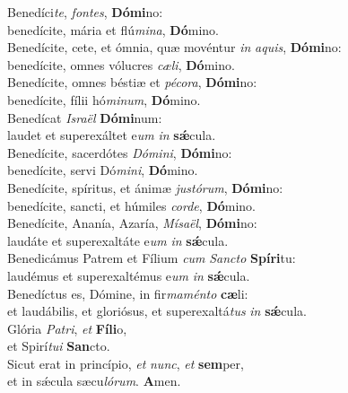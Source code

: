 \evenverse Benedíci\textit{te}, \textit{fon}\textit{tes}, \textbf{Dó}\textbf{mi}no:~\*\\
\evenverse benedícite, mária et flú\textit{mi}\textit{na}, \textbf{Dó}mino.\\
\oddverse Benedícite, cete, et ómnia, quæ movéntur \textit{in} \textit{a}\textit{quis}, \textbf{Dó}\textbf{mi}no:~\*\\
\oddverse benedícite, omnes vólucres \textit{cæ}\textit{li}, \textbf{Dó}mino.\\
\evenverse Benedícite, omnes béstiæ et \textit{pé}\textit{co}\textit{ra}, \textbf{Dó}\textbf{mi}no:~\*\\
\evenverse benedícite, fílii hó\textit{mi}\textit{num}, \textbf{Dó}mino.\\
\oddverse Benedícat \textit{Is}\textit{ra}\textit{ël} \textbf{Dó}\textbf{mi}num:~\*\\
\oddverse laudet et superexáltet e\textit{um} \textit{in} \textbf{sǽ}cula.\\
\evenverse Benedícite, sacerdótes \textit{Dó}\textit{mi}\textit{ni}, \textbf{Dó}\textbf{mi}no:~\*\\
\evenverse benedícite, servi Dó\textit{mi}\textit{ni}, \textbf{Dó}mino.\\
\oddverse Benedícite, spíritus, et ánimæ \textit{ju}\textit{stó}\textit{rum}, \textbf{Dó}\textbf{mi}no:~\*\\
\oddverse benedícite, sancti, et húmiles \textit{cor}\textit{de}, \textbf{Dó}mino.\\
\evenverse Benedícite, Ananía, Azaría, \textit{Mí}\textit{sa}\textit{ël}, \textbf{Dó}\textbf{mi}no:~\*\\
\evenverse laudáte et superexaltáte e\textit{um} \textit{in} \textbf{sǽ}cula.\\
\oddverse Benedicámus Patrem et Fílium \textit{cum} \textit{San}\textit{cto} \textbf{Spí}\textbf{ri}tu:~\*\\
\oddverse laudémus et superexaltémus e\textit{um} \textit{in} \textbf{sǽ}cula.\\
\evenverse Benedíctus es, Dómine, in fir\textit{ma}\textit{mén}\textit{to} \textbf{cæ}li:~\*\\
\evenverse et laudábilis, et gloriósus, et superexaltá\textit{tus} \textit{in} \textbf{sǽ}cula.\\
\oddverse Glória \textit{Pa}\textit{tri}, \textit{et} \textbf{Fí}\textbf{li}o,~\*\\
\oddverse et Spirí\textit{tu}\textit{i} \textbf{San}cto.\\
\evenverse Sicut erat in princípio, \textit{et} \textit{nunc}, \textit{et} \textbf{sem}per,~\*\\
\evenverse et in sǽcula sæcu\textit{ló}\textit{rum}. \textbf{A}men.\\
